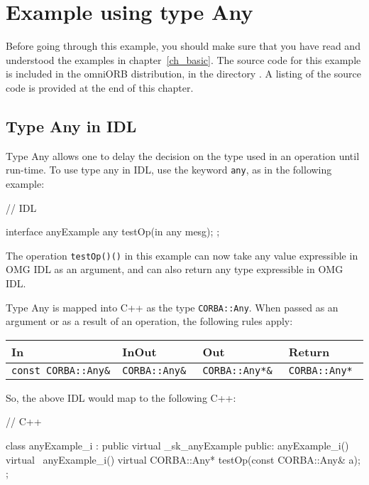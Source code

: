 \documentclass[11pt,twoside,a4paper]{book}
\newcommand{\type}[1]{\texttt{#1}}
\newcommand{\code}[1]{\texttt{#1}}
\newcommand{\op}[1]{\texttt{#1()}}
\newcommand{\file}{\begingroup \urlstyle{tt}\Url}
\begin{document}
\section{Example using type Any}

Before going through this example, you should make sure that you have
read and understood the examples in chapter~\ref{ch_basic}.  The
source code for this example is included in the omniORB distribution,
in the directory \file{src/examples/anyExample}. A listing of the
source code is provided at the end of this chapter.

\subsection{Type Any in IDL}
Type Any allows one to delay the decision on the type used in an
operation until run-time. To use type any in IDL, use the keyword
\code{any}, as in the following example:

\begin{idllisting}
// IDL

interface anyExample {
  any testOp(in any mesg);
};
\end{idllisting}


The operation \op{testOp()} in this example can now take any value
expressible in OMG IDL as an argument, and can also return any type
expressible in OMG IDL.

Type Any is mapped into C++ as the type \type{CORBA::Any}. When passed
as an argument or as a result of an operation, the following rules
apply:

\mbox{}

{\small
\begin{tabular}{llll}
{\bf In }                & {\bf InOut }       & {\bf Out }           & 
{\bf Return }                                                   \\ \hline
{\tt const CORBA::Any\& }& {\tt CORBA::Any\& }& {\tt CORBA::Any*\& } & 
{\tt CORBA::Any* }
\end{tabular}
}

\mbox{}

So, the above IDL would map to the following C++:

\begin{cxxlisting}
// C++

class anyExample_i : public virtual _sk_anyExample {
public:
  anyExample_i() { }
  virtual ~anyExample_i() { }
  virtual CORBA::Any* testOp(const CORBA::Any& a);
};
\end{cxxlisting}
\end{document}
